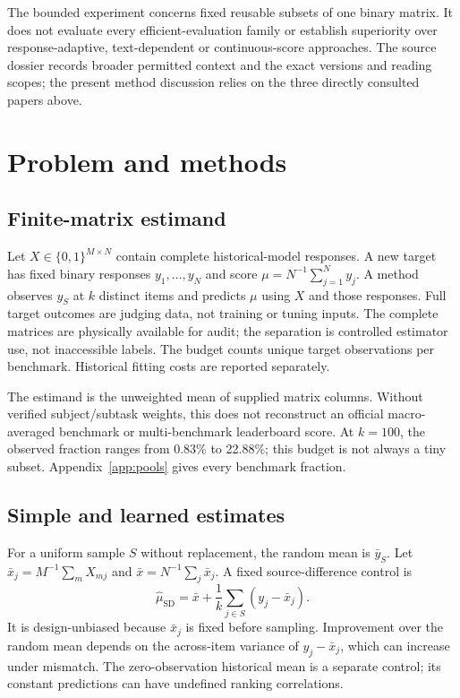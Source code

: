 \documentclass{article}
\begin{document}
The bounded experiment concerns fixed reusable subsets of one binary matrix. It does not evaluate every efficient-evaluation family or establish superiority over response-adaptive, text-dependent or continuous-score approaches. The source dossier records broader permitted context and the exact versions and reading scopes; the present method discussion relies on the three directly consulted papers above.

\section{Problem and methods}\label{sec:methods}
\subsection{Finite-matrix estimand}
Let $X\in\{0,1\}^{M\times N}$ contain complete historical-model responses. A new target has fixed binary responses $y_1,\ldots,y_N$ and score $\mu=N^{-1}\sum_{j=1}^N y_j$. A method observes $y_S$ at $k$ distinct items and predicts $\mu$ using $X$ and those responses. Full target outcomes are judging data, not training or tuning inputs. The complete matrices are physically available for audit; the separation is controlled estimator use, not inaccessible labels. The budget counts unique target observations per benchmark. Historical fitting costs are reported separately.

The estimand is the unweighted mean of supplied matrix columns. Without verified subject/subtask weights, this does not reconstruct an official macro-averaged benchmark or multi-benchmark leaderboard score. At $k=100$, the observed fraction ranges from 0.83\% to 22.88\%; this budget is not always a tiny subset. Appendix~\ref{app:pools} gives every benchmark fraction.

\subsection{Simple and learned estimates}
For a uniform sample $S$ without replacement, the random mean is $\bar y_S$. Let $\bar x_j=M^{-1}\sum_m X_{mj}$ and $\bar x=N^{-1}\sum_j\bar x_j$. A fixed source-difference control is
\begin{equation}\label{eq:source-difference}
 \widehat\mu_{\mathrm{SD}}=\bar x+\frac1k\sum_{j\in S}(y_j-\bar x_j).
\end{equation}
It is design-unbiased because $\bar x_j$ is fixed before sampling. Improvement over the random mean depends on the across-item variance of $y_j-\bar x_j$, which can increase under mismatch. The zero-observation historical mean is a separate control; its constant predictions can have undefined ranking correlations.
\end{document}
